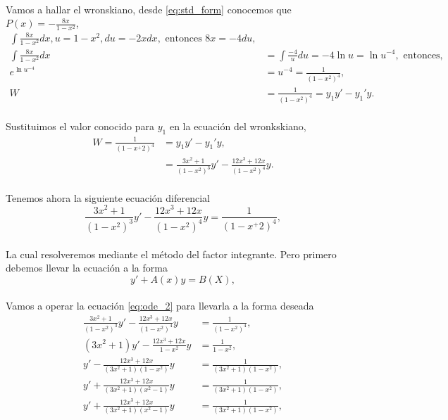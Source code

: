 \documentclass{article}
\begin{document}
\paragraph{} Vamos a hallar el wronskiano, desde \eqref{eq:std_form} conocemos que $P(x) = -\frac{8x}{1-x^2}$,
\begin{align*}
\int \frac{8x}{1-x^2} dx, u = 1-x^2, du = -2x dx, \text{ entonces } 8x = -4du,\\
\int \frac{8x}{1-x^2} dx &= \int \frac{-4}{u} du = -4 \ln {u} = \ln {u^{-4}}, \text{ entonces, }\\
e^{\ln{u^{-4}}} &= u^{-4} = \frac{1}{(1-x^2)^4},\\
W &= \frac{1}{(1-x^2)^4} = y_1y' - y_1'y.  
\end{align*}
\paragraph{} Sustituimos el valor conocido para $y_1$ en la ecuación del wronkskiano,
\begin{align*}
W = \frac{1}{(1-x^+2)^4} &= y_1y' - y_1'y,\\
&= \frac{3x^2+1}{(1-x^2)^3}y' - \frac{12x^3 + 12x}{(1-x^2)^4} y.
\end{align*}
\paragraph{}Tenemos ahora la siguiente ecuación diferencial
\begin{equation}
\frac{3x^2+1}{(1-x^2)^3}y' - \frac{12x^3 + 12x}{(1-x^2)^4} y = \frac{1}{(1-x^+2)^4},\label{eq:ode_2}
\end{equation}
\paragraph{}La cual resolveremos mediante el método del factor integrante. Pero primero debemos llevar la ecuación a la forma 
$$y' + A(x)y = B(X),$$
\paragraph{}Vamos a operar la ecuación \eqref{eq:ode_2} para llevarla a la forma deseada
\begin{align*}
\frac{3x^2+1}{(1-x^2)^3}y' - \frac{12x^3 + 12x}{(1-x^2)^4} y &= \frac{1}{(1-x^2)^4},\\
(3x^2+1)y' - \frac{12x^3 + 12x}{1-x^2} y &= \frac{1}{1-x^2},\\
y'- \frac{12x^3 + 12x}{(3x^2+1)(1-x^2)} y &= \frac{1}{(3x^2+1)(1-x^2)},\\
y'+ \frac{12x^3 + 12x}{(3x^2+1)(x^2 - 1)} y &= \frac{1}{(3x^2+1)(1-x^2)},\\
y'+ \frac{12x^3 + 12x}{(3x^2+1)(x^2 - 1)} y &= \frac{1}{(3x^2+1)(1-x^2)},\\
\end{align*}
\end{document}
